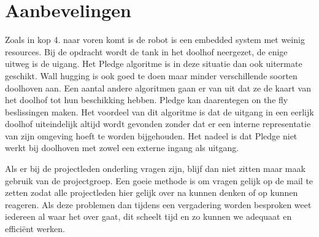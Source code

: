 \documentclass{article}
\begin{document}
\section{Aanbevelingen}
Zoals in kop 4. naar voren komt is de robot is een embedded system met weinig resources.
Bij de opdracht wordt de tank in het doolhof neergezet, de enige uitweg is de uigang.
Het Pledge algoritme is in deze situatie dan ook uitermate geschikt. Wall hugging is ook goed te doen maar minder verschillende soorten doolhoven aan. Een aantal andere algoritmen gaan er van uit dat ze de kaart van het doolhof tot hun beschikking hebben. Pledge kan daarentegen on the fly beslissingen maken. Het voordeel van dit
algoritme is dat de uitgang in een eerlijk doolhof uiteindelijk altijd wordt gevonden zonder
dat er een interne representatie van zijn omgeving hoeft te worden bijgehouden. Het nadeel is dat Pledge niet werkt
bij doolhoven met zowel een externe ingang als uitgang. 

Als er bij de projectleden onderling vragen zijn, blijf dan niet zitten maar maak gebruik van
de projectgroep. Een goeie methode is om vragen gelijk op de mail te zetten zodat alle
projectleden hier gelijk over na kunnen denken of op kunnen reageren. Als deze problemen
dan tijdens een vergadering worden besproken weet iedereen al waar het over gaat, dit
scheelt tijd en zo kunnen we adequaat en efficiënt werken.
\end{document}

